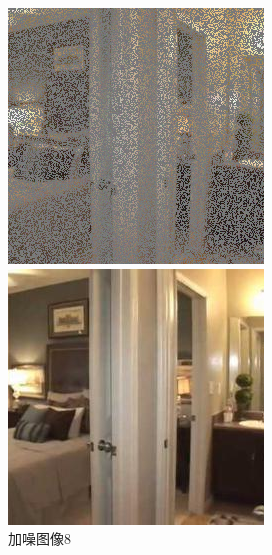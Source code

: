\begin{figure}[H]
  \centering
  \begin{minipage}[b]{0.3\linewidth}
\includegraphics[width=\linewidth]{Picture/input/00010.png}
    \caption{加噪图像8}
    \label{noised image  8}
  \end{minipage}
  \hspace{0.1cm} %
   \begin{minipage}[b]{0.3\linewidth}
    \includegraphics[width=\linewidth]{Picture/label/00010.png}

\end{minipage}
\end{figure}
